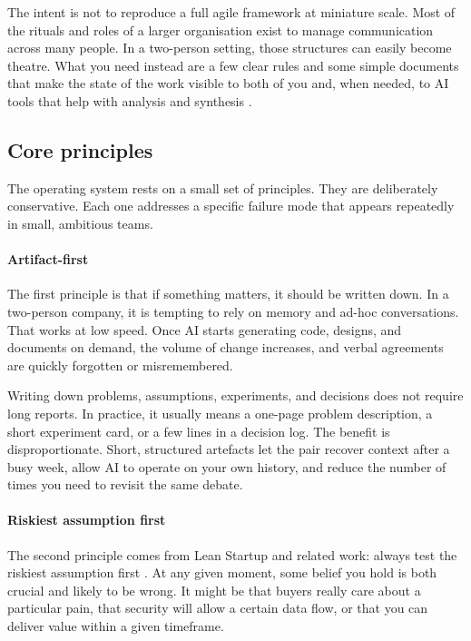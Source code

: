 \documentclass[10pt, a4paper, twocolumn]{article} %
\begin{document}
The intent is not to reproduce a full agile framework at miniature scale. Most of the rituals and roles of a larger organisation exist to manage communication across many people. In a two-person setting, those structures can easily become theatre. What you need instead are a few clear rules and some simple documents that make the state of the work visible to both of you and, when needed, to AI tools that help with analysis and synthesis \citep{ries2011lean,bland2019testing,blomgren2025coordination}.

\subsection{Core principles}

The operating system rests on a small set of principles. They are deliberately conservative. Each one addresses a specific failure mode that appears repeatedly in small, ambitious teams.

\paragraph{Artifact-first}

The first principle is that if something matters, it should be written down. In a two-person company, it is tempting to rely on memory and ad-hoc conversations. That works at low speed. Once AI starts generating code, designs, and documents on demand, the volume of change increases, and verbal agreements are quickly forgotten or misremembered.

Writing down problems, assumptions, experiments, and decisions does not require long reports. In practice, it usually means a one-page problem description, a short experiment card, or a few lines in a decision log. The benefit is disproportionate. Short, structured artefacts let the pair recover context after a busy week, allow AI to operate on your own history, and reduce the number of times you need to revisit the same debate.

\paragraph{Riskiest assumption first}

The second principle comes from Lean Startup and related work: always test the riskiest assumption first \citep{ries2011lean,bland2019testing}. At any given moment, some belief you hold is both crucial and likely to be wrong. It might be that buyers really care about a particular pain, that security will allow a certain data flow, or that you can deliver value within a given timeframe.
\end{document}
